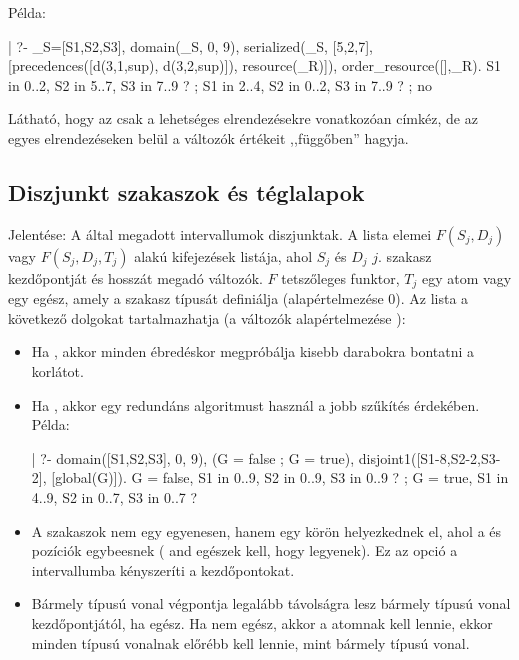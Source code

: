 Példa:

\begin{prologcode}
| ?- _S=[S1,S2,S3], domain(_S, 0, 9),
     serialized(_S, [5,2,7],
                [precedences([d(3,1,sup), d(3,2,sup)]),
                 resource(_R)]), order_resource([],_R).
S1 in 0..2, S2 in 5..7, S3 in 7..9 ? ;
S1 in 2..4, S2 in 0..2, S3 in 7..9 ? ;
no
\end{prologcode}

Látható, hogy az  csak a lehetséges elrendezésekre vonatkozóan
címkéz, de az egyes elrendezéseken belül a változók értékeit ,,függőben'' hagyja.

\subsection{Diszjunkt szakaszok és téglalapok}

{}

Jelentése: A  által megadott intervallumok diszjunktak. A  lista
elemei $F(S_j,D_j)$ vagy $F(S_j,D_j,T_j)$ alakú kifejezések listája, ahol $S_j$ és
$D_j$ $j$. szakasz kezdőpontját és hosszát megadó változók. $F$ tetszőleges funktor,
$T_j$ egy atom vagy egy egész, amely a szakasz típusát definiálja (alapértelmezése 0).
Az  lista a következő dolgokat tartalmazhatja (a  változók
alapértelmezése ):

\begin{itemize}
\item {}
          Ha  , akkor minden ébredéskor megpróbálja kisebb
          darabokra bontatni a korlátot.

\item {}
          Ha  , akkor egy redundáns algoritmust használ a
          jobb szűkítés érdekében. Példa:

\begin{prologcode}
| ?- domain([S1,S2,S3], 0, 9), (G = false ; G = true),
     disjoint1([S1-8,S2-2,S3-2], [global(G)]).
       G = false, S1 in 0..9, S2 in 0..9, S3 in 0..9 ? ;
       G = true,  S1 in 4..9, S2 in 0..7, S3 in 0..7 ?
\end{prologcode}

\item {}
          A szakaszok nem egy egyenesen, hanem egy körön helyezkednek el,
          ahol a  és  pozíciók egybeesnek ( and
           egészek kell, hogy legyenek). Ez az opció a 
          intervallumba kényszeríti a kezdőpontokat.

\item {}
          Bármely  típusú vonal végpontja legalább  távolságra lesz
          bármely  típusú vonal kezdőpontjától, ha  egész.
          Ha  nem egész, akkor a  atomnak kell lennie, ekkor
          minden  típusú vonalnak előrébb kell lennie, mint bármely
           típusú vonal.
\end{itemize}

